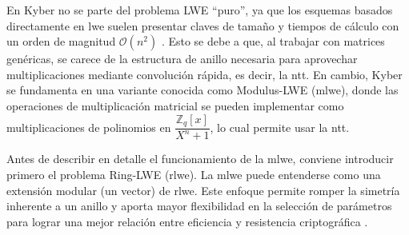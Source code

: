 En Kyber no se parte del problema LWE “puro”, ya que los esquemas basados directamente en \acrshort{lwe} suelen presentar claves de tamaño y tiempos de cálculo con un orden de magnitud \(\mathcal{O}(n^2)\) \cite{Micciancio2009}. Esto se debe a que, al trabajar con matrices genéricas, se carece de la estructura de anillo necesaria para aprovechar multiplicaciones mediante convolución rápida, es decir, la \acrshort{ntt}. En cambio, Kyber se fundamenta en una variante conocida como Modulus-LWE (\acrshort{mlwe}), donde las operaciones de multiplicación matricial se pueden implementar como multiplicaciones de polinomios en $\dfrac{\mathbb{Z}_q[x]}{X^n + 1}$, lo cual permite usar la \acrshort{ntt}.
\newline


Antes de describir en detalle el funcionamiento de la \acrshort{mlwe}, conviene introducir primero el problema Ring-LWE (\acrshort{rlwe}). La \acrshort{mlwe} puede entenderse como una extensión modular (un vector) de \acrshort{rlwe}. Este enfoque permite romper la simetría inherente a un anillo y aporta mayor flexibilidad en la selección de parámetros para lograr una mejor relación entre eficiencia y resistencia criptográfica \cite{cryptoeprint:2019/930}.
\newline


